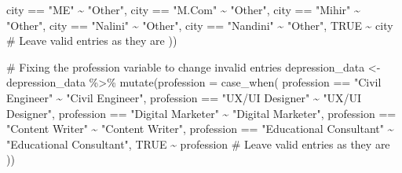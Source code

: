 \documentclass[
  letterpaper,
  DIV=11,
  numbers=noendperiod]{scrartcl}
\newenvironment{Shaded}{\begin{snugshade}}{\end{snugshade}}
\newcommand{\AttributeTok}[1]{\textcolor[rgb]{0.40,0.45,0.13}{#1}}
\newcommand{\CommentTok}[1]{\textcolor[rgb]{0.37,0.37,0.37}{#1}}
\newcommand{\ConstantTok}[1]{\textcolor[rgb]{0.56,0.35,0.01}{#1}}
\newcommand{\FunctionTok}[1]{\textcolor[rgb]{0.28,0.35,0.67}{#1}}
\newcommand{\NormalTok}[1]{\textcolor[rgb]{0.00,0.23,0.31}{#1}}
\newcommand{\OtherTok}[1]{\textcolor[rgb]{0.00,0.23,0.31}{#1}}
\newcommand{\SpecialCharTok}[1]{\textcolor[rgb]{0.37,0.37,0.37}{#1}}
\newcommand{\StringTok}[1]{\textcolor[rgb]{0.13,0.47,0.30}{#1}}
\begin{document}
\begin{Shaded}
\begin{Highlighting}[numbers=left,,]
\NormalTok{    city }\SpecialCharTok{==} \StringTok{"ME"} \SpecialCharTok{\textasciitilde{}} \StringTok{"Other"}\NormalTok{,}
\NormalTok{    city }\SpecialCharTok{==} \StringTok{"M.Com"} \SpecialCharTok{\textasciitilde{}} \StringTok{"Other"}\NormalTok{,}
\NormalTok{    city }\SpecialCharTok{==} \StringTok{"Mihir"} \SpecialCharTok{\textasciitilde{}} \StringTok{"Other"}\NormalTok{,}
\NormalTok{    city }\SpecialCharTok{==} \StringTok{"Nalini"} \SpecialCharTok{\textasciitilde{}} \StringTok{"Other"}\NormalTok{,}
\NormalTok{    city }\SpecialCharTok{==} \StringTok{"Nandini"} \SpecialCharTok{\textasciitilde{}} \StringTok{"Other"}\NormalTok{,}
    \ConstantTok{TRUE} \SpecialCharTok{\textasciitilde{}}\NormalTok{ city  }\CommentTok{\# Leave valid entries as they are}
\NormalTok{  ))}

\CommentTok{\# Fixing the \textasciigrave{}profession\textasciigrave{} variable to change invalid entries}
\NormalTok{depression\_data }\OtherTok{\textless{}{-}}\NormalTok{ depression\_data }\SpecialCharTok{\%\textgreater{}\%}
  \FunctionTok{mutate}\NormalTok{(}\AttributeTok{profession =} \FunctionTok{case\_when}\NormalTok{(}
\NormalTok{    profession }\SpecialCharTok{==} \StringTok{"\textquotesingle{}Civil Engineer\textquotesingle{}"} \SpecialCharTok{\textasciitilde{}} \StringTok{"Civil Engineer"}\NormalTok{,}
\NormalTok{    profession }\SpecialCharTok{==} \StringTok{"\textquotesingle{}UX/UI Designer\textquotesingle{}"} \SpecialCharTok{\textasciitilde{}} \StringTok{"UX/UI Designer"}\NormalTok{,}
\NormalTok{    profession }\SpecialCharTok{==} \StringTok{"\textquotesingle{}Digital Marketer\textquotesingle{}"} \SpecialCharTok{\textasciitilde{}} \StringTok{"Digital Marketer"}\NormalTok{,}
\NormalTok{    profession }\SpecialCharTok{==} \StringTok{"\textquotesingle{}Content Writer\textquotesingle{}"} \SpecialCharTok{\textasciitilde{}} \StringTok{"Content Writer"}\NormalTok{,}
\NormalTok{    profession }\SpecialCharTok{==} \StringTok{"\textquotesingle{}Educational Consultant\textquotesingle{}"} \SpecialCharTok{\textasciitilde{}} \StringTok{"Educational Consultant"}\NormalTok{,}
    \ConstantTok{TRUE} \SpecialCharTok{\textasciitilde{}}\NormalTok{ profession }\CommentTok{\# Leave valid entries as they are}
\NormalTok{  ))}


\end{Highlighting}
\end{Shaded}
\end{document}
